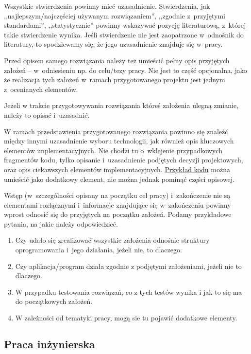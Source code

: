 Wszystkie stwierdzenia powinny mieć uzasadnienie. Stwierdzenia, jak ,,najlepszym/najczęściej używanym rozwiązaniem'', ,,zgodnie z~przyjętymi 
standardami'', ,,statystycznie'' powinny wskazywać pozycję literaturową, z~której takie 
stwierdzenie wynika. Jeśli stwierdzenie nie jest zaopatrzone w~odnośnik do literatury, to spodziewamy się, że jego uzasadnienie znajduje się w~pracy.
 
Przed opisem samego rozwiązania należy też umieścić pełny opis przyjętych założeń --
w~odniesieniu np. do celu/tezy pracy. Nie jest to część opcjonalna, jako że realizacja 
tych założeń w~ramach przygotowanego projektu jest jednym z~ocenianych 
elementów.

Jeżeli w trakcie przygotowywania rozwiązania któreś założenia ulegną zmianie, 
należy to opisać i~uzasadnić. 

W ramach przedstawienia przygotowanego rozwiązania powinno się znaleźć między innymi uzasadnienie wyboru technologii, jak również opis kluczowych elementów implementacyjnych. Nie chodzi tu o~wklejenie przypadkowych fragmentów kodu, tylko opisanie i~uzasadnienie podjętych decyzji projektowych, oraz opis ciekawszych elementów implementacyjnych. \hyperref[sec:dod:listing]{Przykład kodu} można umieścić jako dodatkowy element, nie można jednak pominąć części opisowej. 

Wstęp (w~szczególności opisany na początku cel pracy) i~zakończenie nie są 
elementami rozłącznymi i~informacje znajdujące się w~zakończeniu powinny wprost 
odnosić się do przyjętych na początku założeń. Podamy przykładowe pytania, na jakie należy odpowiedzieć.\pagebreak[2]
\begin{enumerate}
\item Czy udało się zrealizować wszystkie założenia odnośnie struktury 
oprogramowania i~jego działania, jeżeli nie, to dlaczego. 
\item Czy aplikacja/program działa zgodnie z podjętymi założeniami, jeżeli nie to 
dlaczego.
\item W przypadku testowania rozwiązań, co z tych testów wynika i jak to się ma do 
początkowych założeń. 
\item W zależności od tematyki pracy, mogą sie tu pojawić dodatkowe elementy. 
\end{enumerate}


\subsection{Praca inżynierska}
\label{sec:dod:ogolne-praca-inzynierska}

